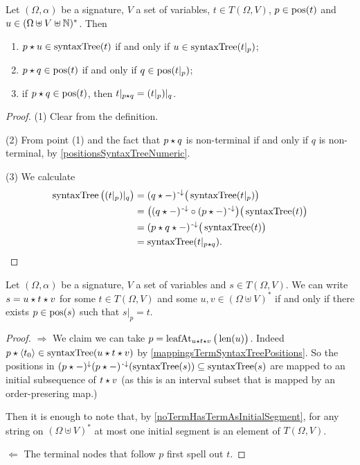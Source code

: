 \begin{lemma}
Let $(\Omega, \alpha)$ be a signature, $V$ a set of variables, $t\in T(\Omega, V)$, $p \in \operatorname{pos}(t)$ and $u\in (\Omega\uplus V\uplus \mathbb{N})^*$. Then
\begin{enumerate}
\item $p\star u \in \operatorname{syntaxTree}(t)$ \textup{if and only if} $u\in \operatorname{syntaxTree}(t|_p)$;
\item $p\star q \in \operatorname{pos}(t)$ \textup{if and only if}  $q\in \operatorname{pos}(t|_p)$;
\item if $p\star q \in \operatorname{pos}(t)$, then $t|_{p\star q} = (t|_p)|_q$.
\end{enumerate}
\end{lemma}
\begin{proof}
(1) Clear from the definition.

(2) From point (1) and the fact that $p\star q$ is non-terminal if and only if $q$ is non-terminal, by \ref{positionsSyntaxTreeNumeric}.

(3) We calculate
\begin{align*}
\operatorname{syntaxTree}\big((t|_p)|_q\big) &= (q\star -)^{\text{\hspace{0.15em}-}\downarrow}\big(\operatorname{syntaxTree}(t|_p)\big) \\
&= \big((q\star -)^{\text{\hspace{0.15em}-}\downarrow} \circ (p\star -)^{\text{\hspace{0.15em}-}\downarrow}\big) \big(\operatorname{syntaxTree}(t)\big) \\
&= (p\star q\star -)^{\text{\hspace{0.15em}-}\downarrow}\big(\operatorname{syntaxTree}(t)\big) \\
&= \operatorname{syntaxTree}(t|_{p\star q}).
\end{align*}
\end{proof}

\begin{lemma}
Let $(\Omega, \alpha)$ be a signature, $V$ a set of variables and $s\in T(\Omega, V)$.
We can write $s = u\star t \star v$ for some $t\in T(\Omega, V)$ and some $u,v\in (\Omega\uplus V)^*$ \textup{if and only if} there exists $p\in\operatorname{pos}(s)$ such that $s|_p = t$.
\end{lemma}
\begin{proof}
$\boxed{\Rightarrow}$ We claim we can take $p = \operatorname{leafAt}_{u\star t \star v}\big(\operatorname{len}(u)\big)$. Indeed $p\star \left\langle t_0 \right\rangle \in \operatorname{syntaxTree}(u\star t \star v)$ by \ref{mappingsTermSyntaxTreePositions}. So the positions in $(p\star -)^\downarrow(p\star -)^{{\text{\hspace{0.15em}-}\downarrow}}(\operatorname{syntaxTree}(s)) \subseteq \operatorname{syntaxTree}(s)$ are mapped to an initial subsequence of $t\star v$ (as this is an interval subset that is mapped by an order-presering map.)

Then it is enough to note that, by \ref{noTermHasTermAsInitialSegment}, for any string on $(\Omega\uplus V)^*$ at most one initial segment is an element of $T(\Omega, V)$.

$\boxed{\Leftarrow}$ The terminal nodes that follow $p$ first spell out $t$.
\end{proof}

